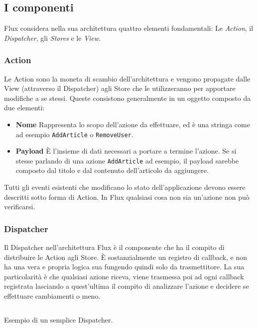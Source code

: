 \subsection{I componenti}
\label{FluxComponents}
Flux considera nella sua architettura quattro elementi fondamentali: Le \textit{Action}, il \textit{Dispatcher}, gli \textit{Stores} e le \textit{View}.

\subsubsection*{Action}
Le Action sono la moneta di scambio dell'architettura e vengono propagate dalle View (attraverso il Dispatcher) agli Store che le utilizzeranno per apportare modifiche a se stessi. Queste consistono generalmente in un oggetto composto da due elementi:

    \begin{itemize}
        \item \textbf{Nome} Rappresenta lo scopo dell'azione da effettuare, ed è una stringa come ad esempio \texttt{AddArticle} o \texttt{RemoveUser}. 
        \item \textbf{Payload} È l'insieme di dati necessari a portare a termine l'azione. Se si stesse parlando di una azione \texttt{AddArticle} ad esempio, il payload sarebbe composto dal titolo e dal contenuto dell'articolo da aggiungere.
    \end{itemize}

Tutti gli eventi esistenti che modificano lo stato dell'applicazione devono essere descritti sotto forma di Action. In Flux qualsiasi cosa non sia un'azione non può verificarsi.

\subsubsection*{Dispatcher}
Il Dispatcher nell'architettura Flux è il componente che ha il compito di distribuire le Action agli Store. È sostanzialmente un registro di callback, e non ha una vera e propria logica sua fungendo quindi solo da trasmettitore. La sua particolarità è che qualsiasi azione riceva, viene trasmessa poi ad ogni callback registrata lasciando a quest'ultima il compito di analizzare l'azione e decidere se effettuare cambiamenti o meno.

\begin{listing}[ht]
\inputminted{javascript}{sources/fluxDispatcherExample.js}
\caption{Esempio di un semplice Dispatcher.} 
\label{applicationMVCPresenterEvents} 
\end{listing} 

